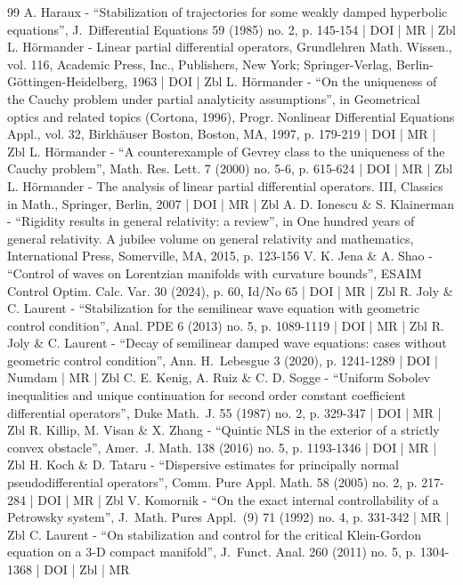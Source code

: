 \begin{thebibliography}{99}
A. Haraux - “Stabilization of trajectories for some weakly damped hyperbolic equations”, J. Differential Equations 59 (1985) no. 2, p. 145-154 | DOI | MR | Zbl
L. Hörmander - Linear partial differential operators, Grundlehren Math. Wissen., vol. 116, Academic Press, Inc., Publishers, New York; Springer-Verlag, Berlin-Göttingen-Heidelberg, 1963 | DOI | Zbl
L. Hörmander - “On the uniqueness of the Cauchy problem under partial analyticity assumptions”, in Geometrical optics and related topics (Cortona, 1996), Progr. Nonlinear Differential Equations Appl., vol. 32, Birkhäuser Boston, Boston, MA, 1997, p. 179-219 | DOI | MR | Zbl
L. Hörmander - “A counterexample of Gevrey class to the uniqueness of the Cauchy problem”, Math. Res. Lett. 7 (2000) no. 5-6, p. 615-624 | DOI | MR | Zbl
L. Hörmander - The analysis of linear partial differential operators. III, Classics in Math., Springer, Berlin, 2007 | DOI | MR | Zbl
A. D. Ionescu \& S. Klainerman - “Rigidity results in general relativity: a review”, in One hundred years of general relativity. A jubilee volume on general relativity and mathematics, International Press, Somerville, MA, 2015, p. 123-156
V. K. Jena \& A. Shao - “Control of waves on Lorentzian manifolds with curvature bounds”, ESAIM Control Optim. Calc. Var. 30 (2024), p. 60, Id/No 65 | DOI | MR | Zbl
R. Joly \& C. Laurent - “Stabilization for the semilinear wave equation with geometric control condition”, Anal. PDE 6 (2013) no. 5, p. 1089-1119 | DOI | MR | Zbl
R. Joly \& C. Laurent - “Decay of semilinear damped wave equations: cases without geometric control condition”, Ann. H. Lebesgue 3 (2020), p. 1241-1289 | DOI | Numdam | MR | Zbl
C. E. Kenig, A. Ruiz \& C. D. Sogge - “Uniform Sobolev inequalities and unique continuation for second order constant coefficient differential operators”, Duke Math. J. 55 (1987) no. 2, p. 329-347 | DOI | MR | Zbl
R. Killip, M. Visan \& X. Zhang - “Quintic NLS in the exterior of a strictly convex obstacle”, Amer. J. Math. 138 (2016) no. 5, p. 1193-1346 | DOI | MR | Zbl
H. Koch \& D. Tataru - “Dispersive estimates for principally normal pseudodifferential operators”, Comm. Pure Appl. Math. 58 (2005) no. 2, p. 217-284 | DOI | MR | Zbl
V. Komornik - “On the exact internal controllability of a Petrowsky system”, J. Math. Pures Appl. (9) 71 (1992) no. 4, p. 331-342 | MR | Zbl
C. Laurent - “On stabilization and control for the critical Klein-Gordon equation on a 3-D compact manifold”, J. Funct. Anal. 260 (2011) no. 5, p. 1304-1368 | DOI | Zbl | MR

\end{thebibliography}
